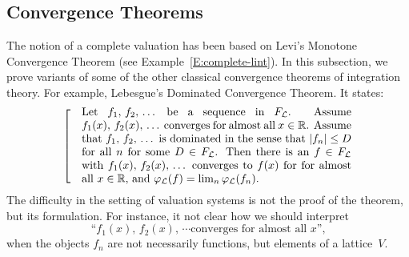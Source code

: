 \documentclass[main.tex]{subfiles}
\begin{document}

\subsection{Convergence Theorems}
\label{SS:complete-val_convergence}
%
%
The notion of a complete valuation
has been based on Levi's Monotone Convergence Theorem
(see Example~\ref{E:complete-lint}).
In this subsection,
we prove variants of some of the other classical convergence theorems
of integration theory.
For example, 
Lebesgue's Dominated Convergence Theorem.
It states:
\begin{equation}
\label{eq:Lebesgue}
\left[\quad
\begin{minipage}{.7\columnwidth}
Let $f_1,\,f_2,\,\dotsc$ be a sequence in~$\LF$.

Assume $f_1(x),\,f_2(x),\,\dotsc$
converges for almost all~$x\in\R$.

Assume that $f_1,\,f_2,\,\dotsc$
 is dominated in the sense that
 $|f_n|\leq D$ for all~$n$
for some $D\in\LF$.

Then there is an $f\in\LF$
with $f_1(x),\,f_2(x),\,\dotsc$ converges to $f(x)$ for 
for almost all~$x\in\R$,
and $\Lphi(f) = \lim_n\Lphi(f_n)$.
\end{minipage}
\right.
\end{equation} 
The difficulty 
in the setting of  valuation systems
is not the proof of the theorem,
but its formulation.
For instance, it 
not clear how we should interpret 
\begin{equation*}
\text{``$f_1(x),\,f_2(x),\,\dotsb$
converges for almost all~$x$'',}
\end{equation*}
when the objects $f_n$ are not necessarily functions,
but elements of a lattice~$V$.
\end{document}
